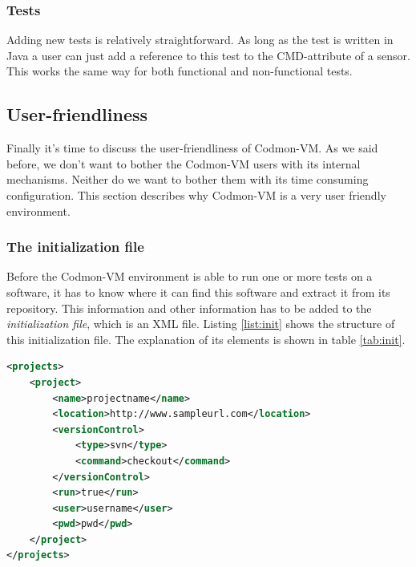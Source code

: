 \documentclass{article}
\newcommand{\project}{Codmon-VM}
\begin{document}
\subsubsection{Tests}
\label{imp:tests}
Adding new tests is relatively straightforward. As long as the test is written in Java a user can just add a reference to this test to the CMD-attribute of a sensor. This works the same way for both functional 
and non-functional tests.


\subsection{User-friendliness}
\label{imp-user}
Finally it's time to discuss the user-friendliness of \project{}. As we said before, we don't want to bother the \project{} users with its internal mechanisms. Neither do we want to bother them with 
its time consuming configuration. This section describes why \project{} is a very user friendly environment.\\

\subsubsection{The initialization file}
\label{imp:init}
\noindent Before the \project{} environment is able to run one or more tests on a software, it has to know where it can find this software and extract it from its repository. This information and other information has to be added to 
the \emph{initialization file}, which is an XML file. Listing \ref{list:init} shows the structure of this initialization file. The explanation of its elements is shown in table \ref{tab:init}. \\

\begin{lstlisting}[frame=shadowbox, language=XML,showstringspaces=false]
 <projects>
	<project>
		<name>projectname</name>
		<location>http://www.sampleurl.com</location>
		<versionControl>
			<type>svn</type>
			<command>checkout</command>
		</versionControl>
		<run>true</run>
		<user>username</user>
		<pwd>pwd</pwd>
	</project>
</projects>
\end{lstlisting} 
\end{document}
